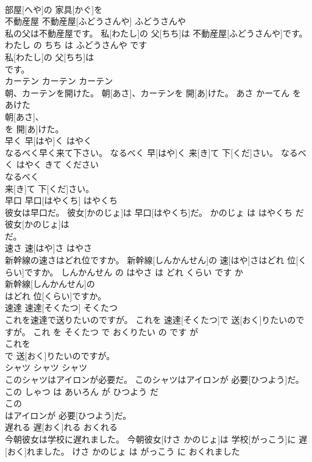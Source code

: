 \documentclass[8pt]{extreport}
\begin{document}
\begin{CJK}{UTF8}{min}
\\	部屋[へや]の 家具[かぐ]を
\\	不動産屋	不動産屋[ふどうさんや]	ふどうさんや	
\\	私の父は不動産屋です。	私[わたし]の 父[ちち]は 不動産屋[ふどうさんや]です。	わたし の ちち は ふどうさんや です	
\\	私[わたし]の 父[ちち]は
\\	です。			
\\	カーテン	カーテン	カーテン	
\\	朝、カーテンを開けた。	朝[あさ]、カーテンを 開[あ]けた。	あさ かーてん を あけた	
\\	朝[あさ]、
\\	を 開[あ]けた。			
\\	早く	早[はや]く	はやく	
\\	なるべく早く来て下さい。	なるべく 早[はや]く 来[き]て 下[くだ]さい。	なるべく はやく きて ください	
\\	なるべく
\\	来[き]て 下[くだ]さい。			
\\	早口	早口[はやくち]	はやくち	
\\	彼女は早口だ。	彼女[かのじょ]は 早口[はやくち]だ。	かのじょ は はやくち だ	
\\	彼女[かのじょ]は
\\	だ。			
\\	速さ	速[はや]さ	はやさ	
\\	新幹線の速さはどれ位ですか。	新幹線[しんかんせん]の 速[はや]さはどれ 位[くらい]ですか。	しんかんせん の はやさ は どれ くらい です か	
\\	新幹線[しんかんせん]の
\\	はどれ 位[くらい]ですか。			
\\	速達	速達[そくたつ]	そくたつ	
\\	これを速達で送りたいのですが。	これを 速達[そくたつ]で 送[おく]りたいのですが。	これ を そくたつ で おくりたい の です が	
\\	これを
\\	で 送[おく]りたいのですが。			
\\	シャツ	シャツ	シャツ	
\\	このシャツはアイロンが必要だ。	このシャツはアイロンが 必要[ひつよう]だ。	この しゃつ は あいろん が ひつよう だ	
\\	この
\\	はアイロンが 必要[ひつよう]だ。			
\\	遅れる	遅[おく]れる	おくれる	
\\	今朝彼女は学校に遅れました。	今朝彼女[けさ かのじょ]は 学校[がっこう]に 遅[おく]れました。	けさ かのじょ は がっこう に おくれました	

\end{CJK}
\end{document}
